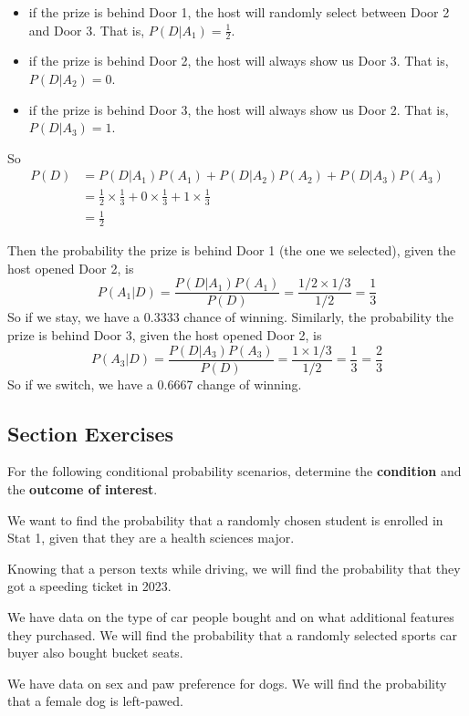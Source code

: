 \documentclass[
]{book}
\providecommand{\tightlist}{%
  \setlength{\itemsep}{0pt}\setlength{\parskip}{0pt}}
\begin{document}
\begin{itemize}
\tightlist
\item
  if the prize is behind Door 1, the host will randomly select between Door 2 and Door 3. That is, \(P(D | A_1) = \frac{1}{2}\).
\item
  if the prize is behind Door 2, the host will always show us Door 3. That is, \(P(D | A_2) = 0\).
\item
  if the prize is behind Door 3, the host will always show us Door 2. That is, \(P(D | A_3) = 1\).
\end{itemize}

So
\[
\begin{aligned}
P(D) &= P(D|A_1)P(A_1) + P(D|A_2)P(A_2) + P(D|A_3)P(A_3) \\
&= \frac{1}{2}\times\frac{1}{3} + 0\times\frac{1}{3} + 1\times\frac{1}{3} \\
&= \frac{1}{2}
\end{aligned}
\]

Then the probability the prize is behind Door 1 (the one we selected), given the host opened Door 2, is \[P(A_1|D) = \frac{P(D|A_1)P(A_1)}{P(D)} = \frac{1/2\times1/3}{1/2} = \frac{1}{3}\] So if we stay, we have a 0.3333 chance of winning. Similarly, the probability the prize is behind Door 3, given the host opened Door 2, is \[P(A_3|D) = \frac{P(D|A_3)P(A_3)}{P(D)} = \frac{1\times1/3}{1/2} = \frac{1}{3} = \frac{2}{3}\] So if we switch, we have a 0.6667 change of winning.

\subsection*{Section Exercises}\label{section-exercises-12}

For the following conditional probability scenarios, determine the \textbf{condition} and the \textbf{outcome of interest}.

We want to find the probability that a randomly chosen student is enrolled in Stat 1, given that they are
a health sciences major.

Knowing that a person texts while driving, we will find the probability that they got a speeding ticket in
2023.

We have data on the type of car people bought and on what additional features they purchased. We will find the probability that a randomly selected sports car buyer also bought bucket seats.

We have data on sex and paw preference for dogs. We will find the probability that a female dog is left-pawed.
\end{document}
